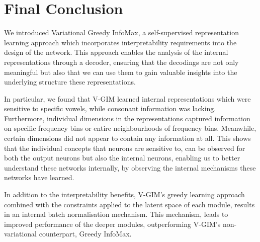 



\section{Final Conclusion}


We introduced Variational Greedy InfoMax, a self-supervised representation learning approach which incorporates interpretability requirements into the design of the network. This approach enables the analysis of the internal representations through a decoder, ensuring that the decodings are not only meaningful but also that we can use them to gain valuable insights into the underlying structure these representations.



In particular, we found that V-GIM learned internal representations which were sensitive to specific vowels, while consonant information was lacking. Furthermore, individual dimensions in the representations captured information on specific frequency bins or entire neighbourhoods of frequency bins. Meanwhile, certain dimensions did not appear to contain any information at all. This shows that the individual concepts that neurons are sensitive to, can be observed for both the output neurons but also the internal neurons, enabling us to better understand these networks internally, by observing the internal mechanisms these networks have learned.

In addition to the interpretability benefits, V-GIM's greedy learning approach combined with the constraints applied to the latent space of each module, results in an internal batch normalisation mechanism. This mechanism, leads to improved performance of the deeper modules, outperforming V-GIM's non-variational counterpart, Greedy InfoMax.

